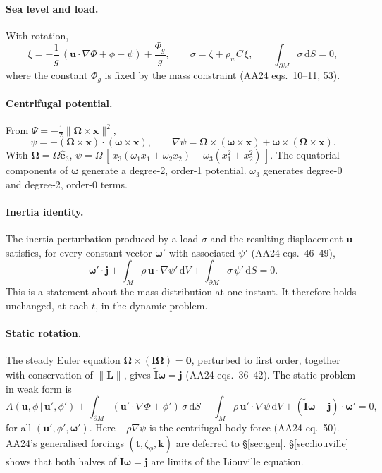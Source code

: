 \documentclass[11pt,a4paper]{article}
\newcommand{\bO}{\bm{\Omega}}
\newcommand{\bw}{\bm{\omega}}
\newcommand{\bx}{\mathbf{x}}
\newcommand{\bu}{\mathbf{u}}
\newcommand{\bt}{\mathbf{t}}
\newcommand{\bj}{\mathbf{j}}
\newcommand{\bk}{\mathbf{k}}
\newcommand{\bI}{\mathbf{I}}
\newcommand{\It}{\tilde{\mathbf{I}}}
\newcommand{\be}{\hat{\mathbf{e}}}
\newcommand{\dd}{\,\mathrm{d}}
\newcommand{\pM}{\partial M}
\begin{document}
\paragraph{Sea level and load.} With rotation,
\begin{equation}
  \xi=-\frac1g\,(\bu\cdot\nabla\Phi+\phi+\psi)+\frac{\Phi_g}{g},\qquad
  \sigma=\zeta+\rho_w C\,\xi,\qquad \int_{\pM}\sigma\dd S=0,
  \label{eq:sl}
\end{equation}
where the constant $\Phi_g$ is fixed by the mass constraint (AA24 eqs.~10--11, 53).

\paragraph{Centrifugal potential.} From $\Psi=-\tfrac12\|\bO\times\bx\|^2$,
\begin{equation}
  \psi=-(\bO\times\bx)\cdot(\bw\times\bx),\qquad
  \nabla\psi=\bO\times(\bw\times\bx)+\bw\times(\bO\times\bx).
  \label{eq:psi}
\end{equation}
With $\bO=\Omega\be_3$, $\psi=\Omega\,[\,x_3(\omega_1x_1+\omega_2x_2)-\omega_3(x_1^2+x_2^2)\,]$.
The equatorial components of $\bw$ generate a degree-2, order-1 potential. $\omega_3$ generates
degree-0 and degree-2, order-0 terms.

\paragraph{Inertia identity.} The inertia perturbation produced by a load $\sigma$ and the
resulting displacement $\bu$ satisfies, for every constant vector $\bw'$ with associated
$\psi'$ (AA24 eqs.~46--49),
\begin{equation}
  \bw'\cdot\bj+\int_M\rho\,\bu\cdot\nabla\psi'\dd V+\int_{\pM}\sigma\,\psi'\dd S=0 .
  \label{eq:inertia}
\end{equation}
This is a statement about the mass distribution at one instant. It therefore holds unchanged, at
each $t$, in the dynamic problem.

\paragraph{Static rotation.} The steady Euler equation $\bO\times(\bI\bO)=\mathbf{0}$, perturbed
to first order, together with conservation of $\|\mathbf{L}\|$, gives $\It\bw=\bj$ (AA24
eqs.~36--42). The static problem in weak form is
\begin{equation}
  A(\bu,\phi\,|\,\bu',\phi')+\int_{\pM}(\bu'\cdot\nabla\Phi+\phi')\,\sigma\dd S
  +\int_M\rho\,\bu'\cdot\nabla\psi\dd V+(\It\bw-\bj)\cdot\bw'=0,
  \label{eq:weakstatic}
\end{equation}
for all $(\bu',\phi',\bw')$. Here $-\rho\nabla\psi$ is the centrifugal body force (AA24 eq.~50).
AA24's generalised forcings $(\bt,\zeta_\phi,\bk)$ are deferred to \S\ref{sec:gen}. \S\ref{sec:liouville}
shows that both halves of $\It\bw=\bj$ are limits of the Liouville equation.
\end{document}
